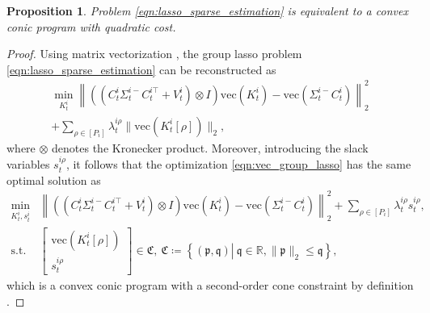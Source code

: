 \documentclass[10pt,a4paper]{amsart}
\newtheorem{proposition}{Proposition}
\begin{document}
\begin{proposition}
Problem \eqref{eqn:lasso_sparse_estimation} is equivalent to a convex conic program with quadratic cost.
\end{proposition}

\begin{proof}
Using matrix vectorization \cite{macedo2013typing}, the group lasso problem \eqref{eqn:lasso_sparse_estimation} can be reconstructed as
\begin{multline}
        \min_{K_t^i}\left\|\left((C_t^i\Sigma_t^{i-}C_t^{i\top}+V_t^i)\otimes I\right)\text{vec}(K_t^i)-\text{vec}(\Sigma_t^{i-}C_t^i)\right\|_2^2\\
        +\sum_{\rho\in[P_i]}\lambda_t^{i\rho}\|\text{vec}(K_t^i[\rho])\|_2,\label{eqn:vec_group_lasso}
\end{multline}
where $\otimes$ denotes the Kronecker product. Moreover, introducing the slack variables $s_t^{i\rho}$, it follows that the optimization \eqref{eqn:vec_group_lasso} has the same optimal solution as 
\begin{align*}
        \min_{K_t^i, s_t^i}&\left\|\left((C_t^i\Sigma_t^{i-}C_t^{i\top}{+}V_t^i)\otimes I\right)\text{vec}(K_t^i){-}\text{vec}(\Sigma_t^{i-}C_t^i)\right\|_2^2{+}\sum_{\rho\in[P_i]}\lambda_t^{i\rho}s_t^{i\rho},\label{eqn:second-order_cone_optimization}\\
        \text{s.t.}\ &\begin{bmatrix}
            \text{vec}(K_t^i[\rho]) \\
            s_t^{i\rho}
        \end{bmatrix}\in\mathfrak{C},\ \mathfrak{C}\coloneqq\left\{(\mathfrak{p},\mathfrak{q})\left|\ \mathfrak{q}\in\mathbb{R}, \|\mathfrak{p}\|_2\leq \mathfrak{q}\right\}\right.,
\end{align*}
which is a convex conic program with a second-order cone constraint by definition \cite{boyd2004convex}. 
\end{proof}

\end{document}
